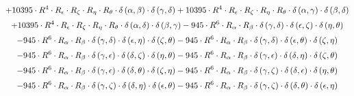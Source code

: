 \begin{subequations}
\begin{gather}
 \\[0.2em] \notag 		 + 10395 \cdot R^{4} \cdot R_{\epsilon{}} \cdot R_{\zeta{}} \cdot R_{\eta{}} \cdot R_{\theta{}} \cdot \delta{}\left(\alpha{}, \beta{}\right) \cdot \delta{}\left(\gamma{}, \delta{}\right)+ 10395 \cdot R^{4} \cdot R_{\epsilon{}} \cdot R_{\zeta{}} \cdot R_{\eta{}} \cdot R_{\theta{}} \cdot \delta{}\left(\alpha{}, \gamma{}\right) \cdot \delta{}\left(\beta{}, \delta{}\right) 
 \\[0.2em] \notag 		 + 10395 \cdot R^{4} \cdot R_{\epsilon{}} \cdot R_{\zeta{}} \cdot R_{\eta{}} \cdot R_{\theta{}} \cdot \delta{}\left(\alpha{}, \delta{}\right) \cdot \delta{}\left(\beta{}, \gamma{}\right)- 945 \cdot R^{6} \cdot R_{\alpha{}} \cdot R_{\beta{}} \cdot \delta{}\left(\gamma{}, \delta{}\right) \cdot \delta{}\left(\epsilon{}, \zeta{}\right) \cdot \delta{}\left(\eta{}, \theta{}\right) 
 \\[0.2em] \notag 		 - 945 \cdot R^{6} \cdot R_{\alpha{}} \cdot R_{\beta{}} \cdot \delta{}\left(\gamma{}, \delta{}\right) \cdot \delta{}\left(\epsilon{}, \eta{}\right) \cdot \delta{}\left(\zeta{}, \theta{}\right)- 945 \cdot R^{6} \cdot R_{\alpha{}} \cdot R_{\beta{}} \cdot \delta{}\left(\gamma{}, \delta{}\right) \cdot \delta{}\left(\epsilon{}, \theta{}\right) \cdot \delta{}\left(\zeta{}, \eta{}\right) 
 \\[0.2em] \notag 		 - 945 \cdot R^{6} \cdot R_{\alpha{}} \cdot R_{\beta{}} \cdot \delta{}\left(\gamma{}, \epsilon{}\right) \cdot \delta{}\left(\delta{}, \zeta{}\right) \cdot \delta{}\left(\eta{}, \theta{}\right)- 945 \cdot R^{6} \cdot R_{\alpha{}} \cdot R_{\beta{}} \cdot \delta{}\left(\gamma{}, \epsilon{}\right) \cdot \delta{}\left(\delta{}, \eta{}\right) \cdot \delta{}\left(\zeta{}, \theta{}\right) 
 \\[0.2em] \notag 		 - 945 \cdot R^{6} \cdot R_{\alpha{}} \cdot R_{\beta{}} \cdot \delta{}\left(\gamma{}, \epsilon{}\right) \cdot \delta{}\left(\delta{}, \theta{}\right) \cdot \delta{}\left(\zeta{}, \eta{}\right)- 945 \cdot R^{6} \cdot R_{\alpha{}} \cdot R_{\beta{}} \cdot \delta{}\left(\gamma{}, \zeta{}\right) \cdot \delta{}\left(\delta{}, \epsilon{}\right) \cdot \delta{}\left(\eta{}, \theta{}\right) 
 \\[0.2em] \notag 		 - 945 \cdot R^{6} \cdot R_{\alpha{}} \cdot R_{\beta{}} \cdot \delta{}\left(\gamma{}, \zeta{}\right) \cdot \delta{}\left(\delta{}, \eta{}\right) \cdot \delta{}\left(\epsilon{}, \theta{}\right)- 945 \cdot R^{6} \cdot R_{\alpha{}} \cdot R_{\beta{}} \cdot \delta{}\left(\gamma{}, \zeta{}\right) \cdot \delta{}\left(\delta{}, \theta{}\right) \cdot \delta{}\left(\epsilon{}, \eta{}\right) 

\end{gather}
\end{subequations}
